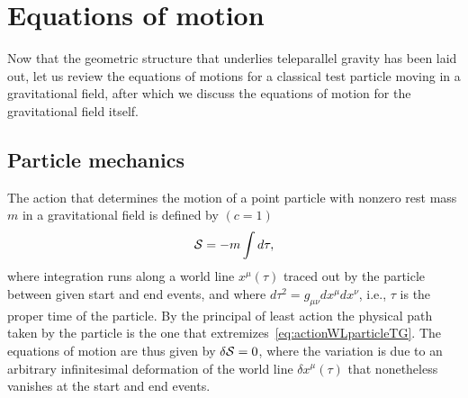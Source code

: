 \documentclass[
final,
11pt,
a4paper,
DIV=11,
headinclude=true,
footinclude=false,
bibliography=totoc,
twoside=true,  %
BCOR=5mm
]{scrbook}
\begin{document}
\section{Equations of motion}
\label{sec:eqs_motion_tg}

Now that the geometric structure that underlies teleparallel 
gravity has been laid out, let us review the equations of motions 
for a classical test particle moving in a gravitational field, 
after which we discuss the equations of motion for the 
gravitational field itself.

\subsection{Particle mechanics}

The action that determines the motion of a point particle with 
nonzero rest mass $m$ in a gravitational field is defined by $(c 
= 1)$~\cite{deAndrade:1997qt}
\begin{equation}
\label{eq:actionWLparticleTG}
  \mathcal{S} = -m \int d\tau,
\end{equation}
where integration runs along a world line $x^\mu(\tau)$ traced out 
by the particle between given start and end events, and where 
$d\tau^2 = g_{\mu\nu} dx^\mu dx^\nu$, i.e., $\tau$ is the proper 
time of the particle.  By the principal of least action the 
physical path taken by the particle is the one that 
extremizes~\eqref{eq:actionWLparticleTG}. The equations of motion 
are thus given by $\delta \mathcal{S} = 0$, where the variation is due 
to an arbitrary infinitesimal deformation of the world line 
$\delta x^\mu(\tau)$ that nonetheless vanishes at the start and 
end events.
\end{document}

